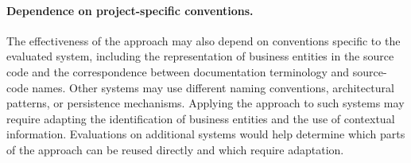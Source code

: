 \newpage
\paragraph{Dependence on project-specific conventions.}\noindent

The effectiveness of the approach may also depend on conventions specific to the evaluated system, including the representation of business entities in the source code and the correspondence between documentation terminology and source-code names. Other systems may use different naming conventions, architectural patterns, or persistence mechanisms. Applying the approach to such systems may require adapting the identification of business entities and the use of contextual information. Evaluations on additional systems would help determine which parts of the approach can be reused directly and which require adaptation.
